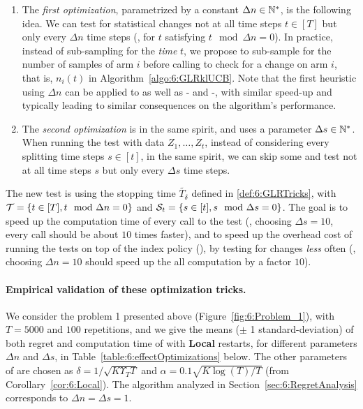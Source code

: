 \begin{enumerate}
    \item
    The \emph{first optimization}, parametrized by a constant $\Delta n \in\mathbb{N}^*$, is the following idea.
    We can test for statistical changes not at all time steps $t\in[T]$ but only every $\Delta n$ time steps (\ie, for $t$ satisfying $t \mod \Delta n = 0$).
    In practice, instead of sub-sampling for the \emph{time} $t$, we propose to sub-sample for the number of samples of arm $i$ before calling \GLR{} to check for a change on arm $i$, that is, $n_i(t)$ in Algorithm~\ref{algo:6:GLRklUCB}.
    Note that the first heuristic using $\Delta n$ can be applied to \MUCB{} as well as \CUSUM-\UCB{} and \PHT-\UCB{}, with similar speed-up and typically leading to similar consequences on the algorithm's performance.

    \item
    The \emph{second optimization} is in the same spirit, and uses a parameter $\Delta s \in\mathbb{N}^*$.
    When running the \GLR{} test with data $Z_1,\dots,Z_t$, instead of considering every splitting time steps $s\in[t]$, in the same spirit, we can skip some and test not at all time steps $s$ but only every $\Delta s$ time steps.
\end{enumerate}


The new \GLR{} test is using the stopping time $\widetilde{T_\delta}$ defined in \eqref{def:6:GLRTricks},
with $\mathcal{T} = \{t \in [T], t \mod \Delta n = 0\}$
and $\mathcal{S}_t = \{s \in [t], s \mod \Delta s = 0\}$.
The goal is to speed up the computation time of every call to the \GLR{} test (\eg, choosing $\Delta s = 10$, every call should be about $10$ times faster), and to speed up the overhead cost of running the tests on top of the index policy (\klUCB), by testing for changes \emph{less} often (\eg, choosing $\Delta n = 10$ should speed up the all computation by a factor $10$).

\paragraph{Empirical validation of these optimization tricks.}
%
We consider the problem 1 presented above (Figure~\ref{fig:6:Problem_1}), with $T=5000$ and $100$ repetitions, and we give the means ($\pm$ 1 standard-deviation) of both regret and computation time of \GLRklUCB{} with \textbf{Local} restarts, for different parameters $\Delta n$ and $\Delta s$, in Table~\ref{table:6:effectOptimizations} below.
The other parameters of \GLRklUCB{} are chosen as $\delta = 1/\sqrt{K \Upsilon_T T}$ and $\alpha = 0.1\sqrt{K\log(T)/T}$ (from Corollary~\ref{cor:6:Local}).
The algorithm analyzed in Section~\ref{sec:6:RegretAnalysis} corresponds to $\Delta n = \Delta s = 1$.


